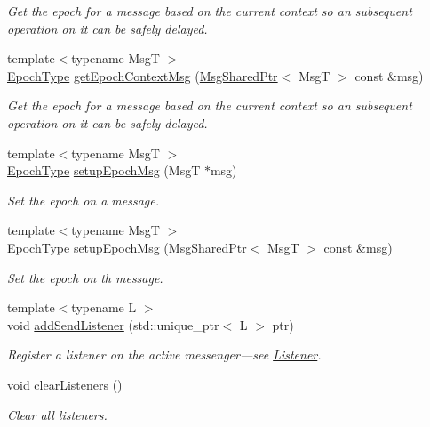 \begin{DoxyCompactItemize}
\begin{DoxyCompactList}\small\item\em Get the epoch for a message based on the current context so an subsequent operation on it can be safely delayed. \end{DoxyCompactList}\item 
{\footnotesize template$<$typename MsgT $>$ }\\\hyperlink{namespacevt_a985a5adf291c34a3ca263b3378388236}{Epoch\+Type} \hyperlink{structvt_1_1messaging_1_1_active_messenger_a66c64223357aa92f45a4a4042bd63a5f}{get\+Epoch\+Context\+Msg} (\hyperlink{structvt_1_1messaging_1_1_msg_shared_ptr}{Msg\+Shared\+Ptr}$<$ MsgT $>$ const \&msg)
\begin{DoxyCompactList}\small\item\em Get the epoch for a message based on the current context so an subsequent operation on it can be safely delayed. \end{DoxyCompactList}\item 
{\footnotesize template$<$typename MsgT $>$ }\\\hyperlink{namespacevt_a985a5adf291c34a3ca263b3378388236}{Epoch\+Type} \hyperlink{structvt_1_1messaging_1_1_active_messenger_a7b5a8fc73617491423bf68c4fbe1e2a2}{setup\+Epoch\+Msg} (MsgT $\ast$msg)
\begin{DoxyCompactList}\small\item\em Set the epoch on a message. \end{DoxyCompactList}\item 
{\footnotesize template$<$typename MsgT $>$ }\\\hyperlink{namespacevt_a985a5adf291c34a3ca263b3378388236}{Epoch\+Type} \hyperlink{structvt_1_1messaging_1_1_active_messenger_ad7402f346c73b2a50ae1feb71140d891}{setup\+Epoch\+Msg} (\hyperlink{structvt_1_1messaging_1_1_msg_shared_ptr}{Msg\+Shared\+Ptr}$<$ MsgT $>$ const \&msg)
\begin{DoxyCompactList}\small\item\em Set the epoch on th message. \end{DoxyCompactList}\item 
{\footnotesize template$<$typename L $>$ }\\void \hyperlink{structvt_1_1messaging_1_1_active_messenger_a3083324696bb4f6e55164da2cb00a1c6}{add\+Send\+Listener} (std\+::unique\+\_\+ptr$<$ L $>$ ptr)
\begin{DoxyCompactList}\small\item\em Register a listener on the active messenger---see {\ttfamily \hyperlink{structvt_1_1messaging_1_1_listener}{Listener}}. \end{DoxyCompactList}\item 
void \hyperlink{structvt_1_1messaging_1_1_active_messenger_af7bcc5ce345c1138a67b6f80abb56705}{clear\+Listeners} ()
\begin{DoxyCompactList}\small\item\em Clear all listeners. \end{DoxyCompactList}\end{DoxyCompactItemize}
